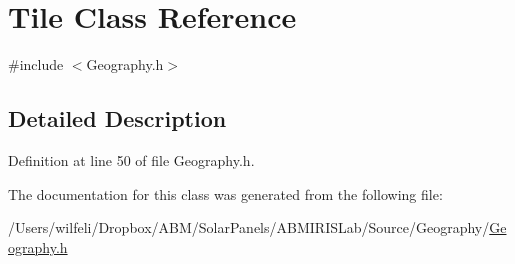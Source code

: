 \hypertarget{class_tile}{}\section{Tile Class Reference}
\label{class_tile}


{\ttfamily \#include $<$Geography.\+h$>$}



\subsection{Detailed Description}


Definition at line 50 of file Geography.\+h.



The documentation for this class was generated from the following file\+:\begin{DoxyCompactItemize}
\item 
/\+Users/wilfeli/\+Dropbox/\+A\+B\+M/\+Solar\+Panels/\+A\+B\+M\+I\+R\+I\+S\+Lab/\+Source/\+Geography/\hyperlink{_geography_8h}{Geography.\+h}\end{DoxyCompactItemize}
